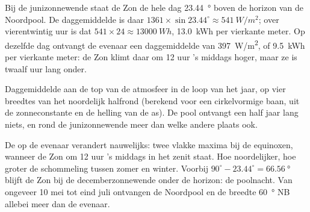 \begin{example}\label{ex:g10:earth-energy-budget:pole}
Bij de junizonnewende staat de Zon de hele dag \qty{23.44}{\degree} boven de
horizon van de Noordpool. De daggemiddelde  is daar $1361
\times \sin 23.44^\circ \approx \qty{541}{W/m^2}$; over vierentwintig uur is
dat $541 \times 24 \approx \qty{13000}{Wh}$, \qty{13.0}{kWh} per vierkante
meter. Op dezelfde dag ontvangt de evenaar een daggemiddelde van
\qty{397}{W/m^2}, of \qty{9.5}{kWh} per vierkante meter: de Zon klimt daar om
12 uur 's middags hoger, maar ze is twaalf uur lang onder.
\end{example}

\begin{omfigure}

{\small Daggemiddelde  aan de top van de atmosfeer in de loop van het
jaar, op vier breedtes van het noordelijk halfrond (berekend voor een
cirkelvormige baan, uit de zonneconstante en de helling van de as). De pool
ontvangt een half jaar lang niets, en rond de junizonnewende meer dan welke
andere plaats ook.}
\end{omfigure}

\begin{remark}\label{rem:g10:earth-energy-budget:curves}
De  op de evenaar verandert nauwelijks: twee vlakke maxima bij de
equinoxen, wanneer de Zon om 12 uur 's middags in het zenit staat. Hoe
noordelijker, hoe groter de schommeling tussen zomer en winter. Voorbij
$90^\circ - 23.44^\circ = \qty{66.56}{\degree}$ blijft de Zon bij de
decemberzonnewende onder de horizon: de poolnacht. Van ongeveer 10 mei tot eind
juli ontvangen de Noordpool en de breedte \qty{60}{\degree} NB allebei meer
dan de evenaar.
\end{remark}

